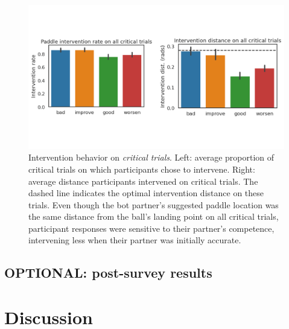 \documentclass[10pt,letterpaper]{article}
\begin{document}
\begin{figure}[H]
\begin{center}
\includegraphics[width=\linewidth]{img/results-critical_trials.png}
\end{center}
\caption{Intervention behavior on \textit{critical trials}. Left: average proportion of critical trials on which participants chose to intervene. Right: average distance participants intervened on critical trials. The dashed line indicates the optimal intervention distance on these trials. Even though the bot partner's suggested paddle location was the same distance from the ball's landing point on all critical trials, participant responses were sensitive to their partner's competence, intervening less when their partner was initially accurate.} 
\label{fig:critical_trials}
\end{figure}


\subsection{OPTIONAL: post-survey results}



\section{Discussion}









\setlength{\bibleftmargin}{.125in}
\setlength{\bibindent}{-\bibleftmargin}
\typeout{} %

\end{document}
